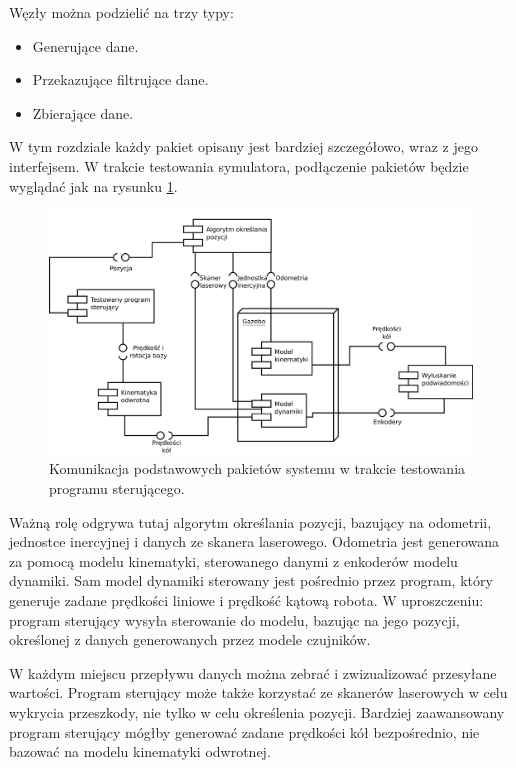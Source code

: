 Węzły można podzielić na trzy typy:
\begin{itemize}
	\item Generujące dane.
	\item Przekazujące filtrujące dane.
	\item Zbierające dane.
\end{itemize}

W tym rozdziale każdy pakiet opisany jest bardziej szczegółowo, wraz z jego interfejsem.
W trakcie testowania symulatora, podłączenie pakietów będzie wyglądać jak na rysunku \ref{uml:final}.

\begin{figure}[H]
	\centering
	\includegraphics[width=\textwidth]{uml/final.pdf}
	\caption{Komunikacja podstawowych pakietów systemu w trakcie testowania programu sterującego.}
	\label{uml:final}
\end{figure}

Ważną rolę odgrywa tutaj algorytm określania pozycji, bazujący na odometrii, jednostce inercyjnej i danych ze skanera laserowego.
Odometria jest generowana za pomocą modelu kinematyki, sterowanego danymi z enkoderów modelu dynamiki.
Sam model dynamiki sterowany jest pośrednio przez program, który generuje zadane prędkości liniowe i prędkość kątową robota.
W uproszczeniu: program sterujący wysyła sterowanie do modelu, bazując na jego pozycji, określonej z danych generowanych przez modele czujników.

W każdym miejscu przepływu danych można zebrać i zwizualizować przesyłane wartości.
Program sterujący może także korzystać ze skanerów laserowych w celu wykrycia przeszkody, nie tylko w celu określenia pozycji.
Bardziej zaawansowany program sterujący mógłby generować zadane prędkości kół bezpośrednio, nie bazować na modelu kinematyki odwrotnej.

